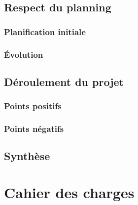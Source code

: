 \documentclass[11pt,a4paper,oldfontcommands]{memoir}
\begin{document}
\section{Respect du planning}

\subsection{Planification initiale}

\subsection{Évolution}

\section{Déroulement du projet}

\subsection{Points positifs}

\subsection{Points négatifs}

\section{Synthèse}


\lstlistoflistings


\appendix


\chapter{Cahier des charges}
\end{document}
